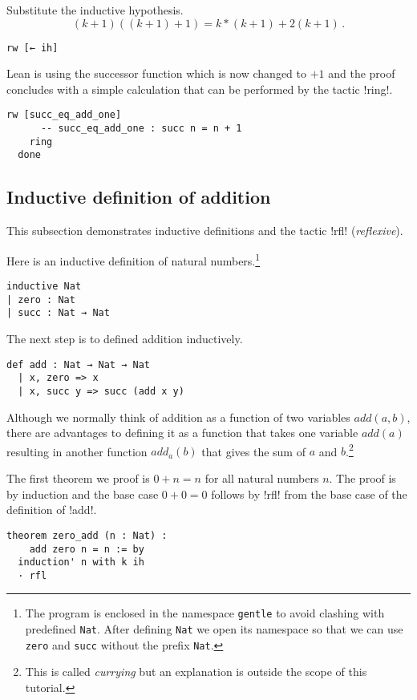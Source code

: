 Substitute the inductive hypothesis.
\[
(k+1)((k+1)+1)=k * (k+1) + 2(k+1)\,.
\]
\begin{Verbatim}[firstnumber=last]
    rw [← ih]
\end{Verbatim}
Lean is using the successor function which is now changed to $+1$ and the proof concludes with a simple calculation that can be performed by the tactic !ring!.
\begin{Verbatim}[firstnumber=last]
    rw [succ_eq_add_one]
      -- succ_eq_add_one : succ n = n + 1
    ring
  done
\end{Verbatim}

\subsection{Inductive definition of addition}

This subsection demonstrates inductive definitions and the tactic !rfl! (\emph{reflexive}).

Here is an inductive definition of natural numbers.\footnote{The program is enclosed in the namespace \Verb+gentle+ to avoid clashing with predefined \Verb+Nat+. After defining \Verb+Nat+ we open its namespace so that we can use \Verb+zero+ and \Verb+succ+ without the prefix \Verb+Nat+.}
\begin{Verbatim}
inductive Nat
| zero : Nat
| succ : Nat → Nat
\end{Verbatim}

The next step is to defined addition inductively.
\begin{Verbatim}[firstnumber=last]
def add : Nat → Nat → Nat
  | x, zero => x
  | x, succ y => succ (add x y)
\end{Verbatim}
Although we normally think of addition as a function of two variables $\textit{add}(a,b)$, there are advantages to defining it as a function that takes one variable $\textit{add}(a)$ resulting in another function $\textit{add}_{a}(b)$ that gives the sum of $a$ and $b$.\footnote{This is called \emph{currying} but an explanation is outside the scope of this tutorial.}

The first theorem we proof is $0+n=n$ for all natural numbers $n$. The proof is by induction and the base case $0+0=0$ follows by !rfl! from the base case of the definition of !add!.
\begin{Verbatim}[firstnumber=last]
theorem zero_add (n : Nat) :
    add zero n = n := by
  induction' n with k ih
  · rfl
\end{Verbatim}

